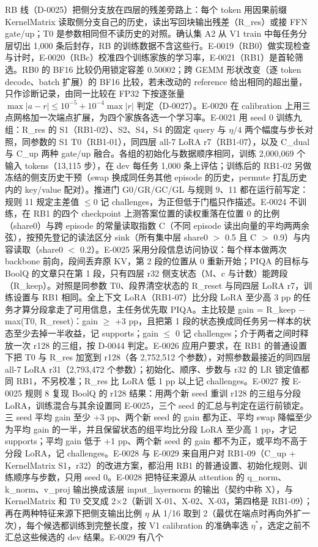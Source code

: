 \documentclass[11pt]{article}
\begin{document}
RB 线（D-0025）把侧分支放在四层的残差旁路上：每个 token 用因果前缀 KernelMatrix 读取侧分支自己的历史，读出写回块输出残差（R\_res）或接 FFN gate/up；T0 是参数相同但不读历史的对照。确认集 A2 从 V1 train 中每任务分层切出 1,000 条后封存，RB 的训练数据不含这些行。E-0019（RB0）做实现检查与计时，E-0020（RBc）校准四个训练家族的学习率，E-0021（RB1）是首轮筛选。RB0 的 BF16 比较仍用锁定容差 0.50002；跨 GEMM 形状改变（逐 token decode、batch 扩展）的 BF16 比较，若未改动的 reference 给出相同的超出量，只作诊断记录，由同一比较在 FP32 下按逐张量 $\max|a-r|\leq 10^{-5}+10^{-4}\max|r|$ 判定（D-0027）。E-0020 在 calibration 上用三点网格加一次端点扩展，为四个家族各选一个学习率。E-0021 用 seed 0 训练九组：R\_res 的 S1（RB1-02）、S2、S4，S4 的固定 query 与 $\eta/4$ 两个幅度与步长对照，同参数的 S1 T0（RB1-01），同四层 all-7 LoRA r7（RB1-07），以及 C\_dual 与 C\_up 两种 gate/up 融合。各组的初始化与数据顺序相同，训练 2,000,069 个输入 tokens（13,115 步），在 dev 每任务 1,000 条上评估；训练后的 RB1-02 另做冻结的侧支历史干预（swap 换成同任务其他 episode 的历史，permute 打乱历史内的 key/value 配对）。推进门 G0/GR/GC/GL 与规则 9、11 都在运行前写定：规则 11 规定主差值 $\leq 0$ 记 challenges，为正但低于门槛只作描述。E-0024 不训练，在 RB1 的四个 checkpoint 上测答案位置的读权重落在位置 0 的比例（share0）与跨 episode 的常量读取指数 C（不同 episode 读出向量的平均两两余弦），按预先登记的读法区分 sink（所有集中层 share0 $>$ 0.5 且 C $>$ 0.9）与内容读取（share0 $<$ 0.2）。E-0025 采用分段信息访问协议：每个样本做两次 backbone 前向，段间丢弃原 KV，第 2 段的位置从 0 重新开始；PIQA 的目标与 BoolQ 的文章只在第 1 段，只有四层 r32 侧支状态（M、c 与计数）能跨段（R\_keep）。对照是同参数 T0、段界清空状态的 R\_reset 与同四层 LoRA r7，训练设置与 RB1 相同。全上下文 LoRA（RB1-07）比分段 LoRA 至少高 3 pp 的任务才算分段拿走了可用信息，主任务优先取 PIQA。主比较是 gain = R\_keep $-$ max(T0, R\_reset)：gain $\geq$ +3 pp，且把第 1 段的状态换成同任务另一样本的状态至少去掉一半收益，记 supports；gain $\leq$ 0 记 challenges；介于两者之间时释放一次 r128 的三组，按 D-0044 判定。E-0026 应用户要求，在 RB1 的普通设置下把 T0 与 R\_res 加宽到 r128（各 2,752,512 个参数），对照参数最接近的同四层 all-7 LoRA r31（2,793,472 个参数）；初始化、顺序、步数与 r32 的 LR 锁定值都同 RB1，不另校准；R\_res 比 LoRA 低 1 pp 以上记 challenges。E-0027 按 E-0025 规则 8 复现 BoolQ 的 r128 结果：用两个新 seed 重训 r128 的三组与分段 LoRA，训练混合与其余设置同 E-0025，三个 seed 的汇总与判定在运行前锁定。三 seed 平均 gain 至少 +3 pp、两个新 seed 的 gain 都为正、平均 swap 降幅至少为平均 gain 的一半，并且保留状态的组平均比分段 LoRA 至少高 1 pp，才记 supports；平均 gain 低于 +1 pp、两个新 seed 的 gain 都不为正，或平均不高于分段 LoRA，记 challenges。E-0028 与 E-0029 来自用户对 RB1-09（C\_up + KernelMatrix S1，r32）的改进方案，都沿用 RB1 的普通设置、初始化规则、训练顺序与步数，只用 seed 0。E-0028 把特征来源从 attention 的 q\_norm、k\_norm、v\_proj 输出换成该层 input\_layernorm 的输出（契约中称 X），与 KernelMatrix 和 T0 交叉成 2$\times$2（新训 X-01、X-02、X-03，第四格是 RB1-09）；再在两种特征来源下把侧支输出比例 $\eta$ 从 1/16 取到 2（最优在端点时再向外扩一次），每个候选都训练到完整长度，按 V1 calibration 的准确率选 $\eta^*$，选定之前不汇总这些候选的 dev 结果。E-0029 有八个 
\end{document}
